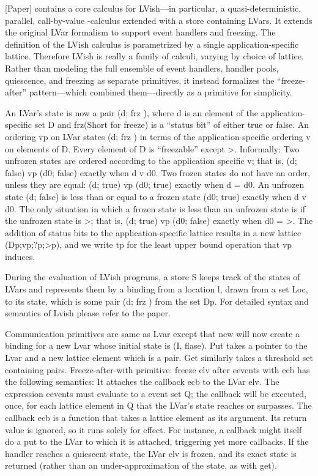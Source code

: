 \documentclass[twocolumn]{article}
\begin{document}
[Paper] contains a core calculus for LVish—in particular, a quasi-deterministic, parallel, call-by-value -calculus extended with a store containing LVars. It extends the original LVar formalism to support event handlers and freezing. The definition of the LVish calculus is parametrized by a single application-specific lattice. Therefore LVish is really a family of calculi, varying by choice of lattice. Rather than modeling the full ensemble of event handlers, handler pools, quiescence, and freezing as separate primitives, it instead formalizes the “freeze-after” pattern—which combined them—directly as a primitive for simplicity.

An LVar’s state is now a pair (d; frz ), where d is an element of the application-specific set D and frz(Short for freeze) is a “status bit” of either true or false. An ordering vp on LVar states (d; frz ) in terms of the application-specific ordering v on elements of D. Every element of D is “freezable” except >. Informally:  Two unfrozen states are ordered according to the application specific v; that is, (d; false) vp (d0; false) exactly when d v d0.
 Two frozen states do not have an order, unless they are equal:
(d; true) vp (d0; true) exactly when d = d0.
 An unfrozen state (d; false) is less than or equal to a frozen state
(d0; true) exactly when d v d0.
 The only situation in which a frozen state is less than an unfrozen
state is if the unfrozen state is >; that is, (d; true) vp
(d0; false) exactly when d0 = >. The addition of status bits to the application-specific lattice results in a new lattice (Dp;vp;?p;>p), and we write tp for the least upper bound operation that vp induces.

During the evaluation of LVish programs, a store S keeps track of the states of LVars and represents them by a binding from a location l, drawn from a set Loc, to its state, which is some pair (d; frz ) from the set Dp.
For detailed syntax and semantics of Lvish please refer to the paper.

Communication primitives are same as Lvar except that new will now create a binding for a new Lvar whose initial state is (I, flase). Put takes a pointer to the Lvar and a new lattice element which is a pair. Get similarly takes a threshold set containing pairs.
Freeze-after-with  primitive: freeze elv after eevents with ecb has the following semantics: It attaches the callback ecb to the LVar elv. The expression eevents must evaluate to a event set Q; the callback will be executed, once, for each lattice element in Q that the LVar’s state reaches or surpasses. The callback ecb is a function that takes a lattice element as its argument. Its return value is ignored, so it runs solely for effect. For instance, a callback might itself do a put to the LVar to which it is attached, triggering yet more callbacks. If the handler reaches a quiescent state, the LVar elv is frozen, and its exact state is returned (rather than an under-approximation of the state, as with get).
\end{document}

